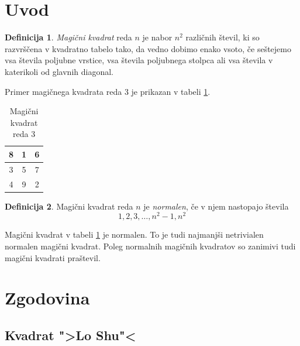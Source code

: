 \documentclass[a4paper,12pt]{article}
\theoremstyle{definition}
\newtheorem{definicija}{Definicija}
\theoremstyle{plain}
\newcommand{\pojem}[1]{\emph{\color{purple}#1}}
\newenvironment{magic}[3]{
   \begin{table}[!ht]
   \centering
   \caption{#2}
   \label{#3}
   \large
   \begin{tabular}{|*{#1}{c|}} \hline
}{
 \end{tabular}
   \normalsize
\end{table}  
}
\begin{document}
\newpage

\section{Uvod}

\begin{definicija}
   \pojem{Magični kvadrat} reda $n$ je nabor $n^2$ različnih števil,
   ki so razvrščena v kvadratno tabelo tako, da vedno dobimo enako vsoto,
   če seštejemo vsa števila poljubne vrstice, vsa števila poljubnega
   stolpca ali vsa števila v katerikoli od glavnih diagonal.
\end{definicija}

Primer magičnega kvadrata reda 3 je prikazan v tabeli \ref{table:mag3}.


\begin{magic}{3}{Magični kvadrat reda 3}{table:mag3}
      8 & 1 & 6 \\\hline
      3 & 5 & 7 \\\hline
      4 & 9 & 2 \\\hline
\end{magic}

\begin{definicija}
   Magični kvadrat reda $n$ je \pojem{normalen}, če v njem nastopajo števila
   \begin{equation}
      1, 2, 3, \ldots, n^2-1, n^2
      \label{eq:numbers}
   \end{equation}
\end{definicija}

Magični kvadrat v tabeli \ref{table:mag3} je normalen.
To je tudi najmanjši netrivialen normalen magični kvadrat.
Poleg normalnih magičnih kvadratov so zanimivi tudi magični kvadrati praštevil.


\section{Zgodovina}

\subsection{Kvadrat ">Lo Shu"<}
\end{document}

